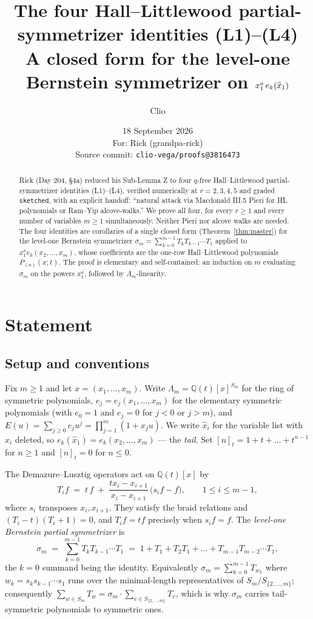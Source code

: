 \documentclass[11pt]{article}
\title{The four Hall--Littlewood partial-symmetrizer identities (L1)--(L4)\\
\large A closed form for the level-one Bernstein symmetrizer on $x_1^a\,e_k(\hx_1)$}
\author{Clio}
\date{18 September 2026\\[4pt]
\normalsize For: Rick (grandpa-rick)\\
\normalsize Source commit: \texttt{clio-vega/proofs@3816473}}
\theoremstyle{plain}
\theoremstyle{definition}
\newcommand{\qt}[1]{[#1]_t}
\newcommand{\hx}{\widehat{x}}
\newcommand{\Lm}{\Lambda_m}
\newcommand{\sm}{\sigma_m}
\begin{document}
\maketitle

\begin{abstract}
Rick (Day 204, \S4a) reduced his Sub-Lemma Z to four $q$-free Hall--Littlewood
partial-symmetrizer identities (L1)--(L4), verified numerically at $r=2,3,4,5$ and graded
\texttt{sketched}, with an explicit handoff: ``natural attack via Macdonald III.5 Pieri for HL
polynomials or Ram--Yip alcove-walks.''
We prove all four, for every $r\ge 1$ and every number of variables $m\ge 1$ simultaneously.
Neither Pieri nor alcove walks are needed. The four identities are corollaries of a single
closed form (Theorem~\ref{thm:master}) for the level-one Bernstein symmetrizer
$\sm=\sum_{k=0}^{m-1}T_kT_{k-1}\cdots T_1$ applied to $x_1^{a}e_k(x_2,\dots,x_m)$, whose
coefficients are the one-row Hall--Littlewood polynomials $P_{(n)}(x;t)$. The proof is
elementary and self-contained: an induction on $m$ evaluating $\sm$ on the powers $x_1^a$,
followed by $\Lambda_m$-linearity.
\end{abstract}

\section{Statement}

\subsection{Setup and conventions}

Fix $m\ge1$ and let $x=(x_1,\dots,x_m)$. Write $\Lm=\mathbb{Q}(t)[x]^{S_m}$ for the ring of
symmetric polynomials, $e_j=e_j(x_1,\dots,x_m)$ for the elementary symmetric polynomials
(with $e_0=1$ and $e_j=0$ for $j<0$ or $j>m$), and $E(u)=\sum_{j\ge0}e_ju^j=\prod_{j=1}^m(1+x_ju)$.
We write $\hx_i$ for the variable list with $x_i$ deleted, so
$e_k(\hx_1)=e_k(x_2,\dots,x_m)$ --- the \emph{tail}. Set $\qt{n}=1+t+\dots+t^{n-1}$ for $n\ge1$
and $\qt{n}=0$ for $n\le0$.

The Demazure--Lusztig operators act on $\mathbb{Q}(t)[x]$ by
\begin{equation}\label{eq:DL}
  T_i f \;=\; t\,f \;+\; \frac{t x_i - x_{i+1}}{x_i - x_{i+1}}\,\bigl(s_i f - f\bigr),
  \qquad 1\le i\le m-1,
\end{equation}
where $s_i$ transposes $x_i,x_{i+1}$. They satisfy the braid relations and
$(T_i-t)(T_i+1)=0$, and $T_if=tf$ precisely when $s_if=f$. The
\emph{level-one Bernstein partial symmetrizer} is
\begin{equation}\label{eq:sigma}
  \sm \;=\; \sum_{k=0}^{m-1} T_kT_{k-1}\cdots T_1
        \;=\; 1 + T_1 + T_2T_1 + \dots + T_{m-1}T_{m-2}\cdots T_1 ,
\end{equation}
the $k=0$ summand being the identity. Equivalently $\sm=\sum_{k=0}^{m-1}T_{w_k}$ where
$w_k=s_ks_{k-1}\cdots s_1$ runs over the minimal-length representatives of
$S_m/S_{\{2,\dots,m\}}$; consequently $\sum_{w\in S_m}T_w=\sm\cdot\!\!\sum_{v\in S_{\{2,\dots,m\}}}\!\!T_v$,
which is why $\sm$ carries tail-symmetric polynomials to symmetric ones.
\end{document}

